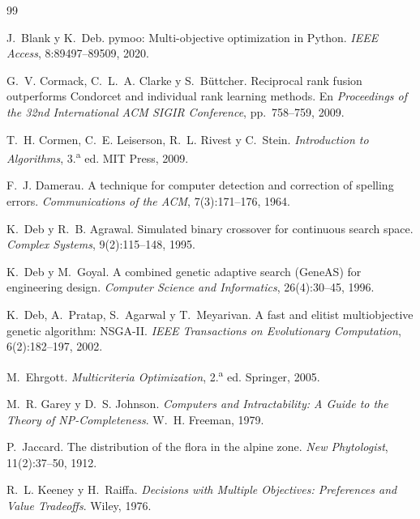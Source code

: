 \begin{thebibliography}{99}

J.~Blank y K.~Deb.
\newblock pymoo: Multi-objective optimization in Python.
\newblock \emph{IEEE Access}, 8:89497--89509, 2020.

G.~V. Cormack, C.~L.~A. Clarke y S.~Büttcher.
\newblock Reciprocal rank fusion outperforms Condorcet and individual rank
  learning methods.
\newblock En \emph{Proceedings of the 32nd International ACM SIGIR Conference},
  pp.~758--759, 2009.

T.~H. Cormen, C.~E. Leiserson, R.~L. Rivest y C.~Stein.
\newblock \emph{Introduction to Algorithms}, 3.\textsuperscript{a} ed.
\newblock MIT Press, 2009.

F.~J. Damerau.
\newblock A technique for computer detection and correction of spelling errors.
\newblock \emph{Communications of the ACM}, 7(3):171--176, 1964.

K.~Deb y R.~B. Agrawal.
\newblock Simulated binary crossover for continuous search space.
\newblock \emph{Complex Systems}, 9(2):115--148, 1995.

K.~Deb y M.~Goyal.
\newblock A combined genetic adaptive search (GeneAS) for engineering design.
\newblock \emph{Computer Science and Informatics}, 26(4):30--45, 1996.

K.~Deb, A.~Pratap, S.~Agarwal y T.~Meyarivan.
\newblock A fast and elitist multiobjective genetic algorithm: NSGA-II.
\newblock \emph{IEEE Transactions on Evolutionary Computation}, 6(2):182--197,
  2002.

M.~Ehrgott.
\newblock \emph{Multicriteria Optimization}, 2.\textsuperscript{a} ed.
\newblock Springer, 2005.

M.~R. Garey y D.~S. Johnson.
\newblock \emph{Computers and Intractability: A Guide to the Theory of
  NP-Completeness}.
\newblock W.~H. Freeman, 1979.

P.~Jaccard.
\newblock The distribution of the flora in the alpine zone.
\newblock \emph{New Phytologist}, 11(2):37--50, 1912.

R.~L. Keeney y H.~Raiffa.
\newblock \emph{Decisions with Multiple Objectives: Preferences and Value
  Tradeoffs}.
\newblock Wiley, 1976.


\end{thebibliography}
